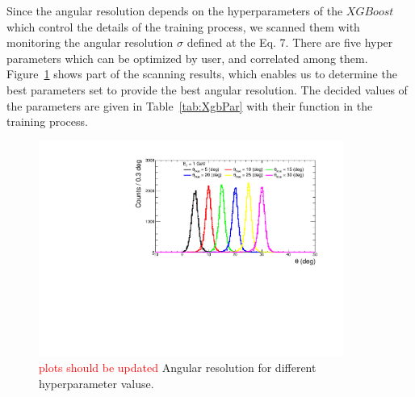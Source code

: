 \documentclass[jkps,preprint,fleqn,showpacs,showkeys]{revtex4}
\newcommand{\XGB}{XGBoost}
\begin{document}
Since the angular resolution depends on the hyperparameters of the $\XGB$ which control the details of the training process, we scanned them with monitoring the angular resolution $\sigma$ defined at the Eq. 7. There are five hyper parameters which can be optimized by user, and correlated among them. Figure~\ref{fig:par_scan} shows part of the scanning results, which enables us to determine the best parameters set to provide the best angular resolution. 
The decided values of the parameters are given in Table~\ref{tab:XgbPar} with their function in the training process. %
 
\begin{figure}[!hbt]
\includegraphics[width=0.89\textwidth]{figures/Fig1_reco_def.pdf}
\caption{\textcolor{red}{plots should be updated}
Angular resolution for different hyperparameter valuse.}
\label{fig:par_scan}
\end{figure}

\end{document}
